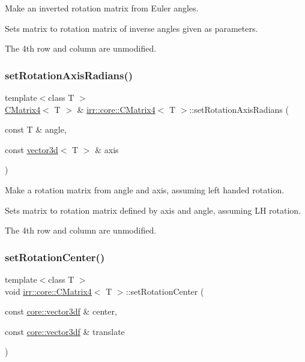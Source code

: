 Make an inverted rotation matrix from Euler angles. 

Sets matrix to rotation matrix of inverse angles given as parameters.

The 4th row and column are unmodified. \mbox{\label{classirr_1_1core_1_1CMatrix4_a2fad61540e78fc7dafe7f6270b0558ac}} 
\subsubsection{\texorpdfstring{set\+Rotation\+Axis\+Radians()}{setRotationAxisRadians()}}
{\footnotesize\ttfamily template$<$class T $>$ \\
\hyperlink{classirr_1_1core_1_1CMatrix4}{C\+Matrix4}$<$ T $>$ \& \hyperlink{classirr_1_1core_1_1CMatrix4}{irr\+::core\+::\+C\+Matrix4}$<$ T $>$\+::set\+Rotation\+Axis\+Radians (\begin{DoxyParamCaption}\item[{const T \&}]{angle,  }\item[{const \hyperlink{classirr_1_1core_1_1vector3d}{vector3d}$<$ T $>$ \&}]{axis }\end{DoxyParamCaption})\hspace{0.3cm}{\ttfamily [inline]}}



Make a rotation matrix from angle and axis, assuming left handed rotation. 

Sets matrix to rotation matrix defined by axis and angle, assuming LH rotation.

The 4th row and column are unmodified. \mbox{\label{classirr_1_1core_1_1CMatrix4_a8117628146ce654b3b292af7c49e25e2}} 
\subsubsection{\texorpdfstring{set\+Rotation\+Center()}{setRotationCenter()}}
{\footnotesize\ttfamily template$<$class T $>$ \\
void \hyperlink{classirr_1_1core_1_1CMatrix4}{irr\+::core\+::\+C\+Matrix4}$<$ T $>$\+::set\+Rotation\+Center (\begin{DoxyParamCaption}\item[{const \hyperlink{namespaceirr_1_1core_a06f169d08b5c429f5575acb7edbad811}{core\+::vector3df} \&}]{center,  }\item[{const \hyperlink{namespaceirr_1_1core_a06f169d08b5c429f5575acb7edbad811}{core\+::vector3df} \&}]{translate }\end{DoxyParamCaption})\hspace{0.3cm}{\ttfamily [inline]}}



